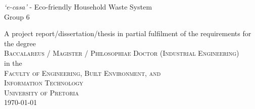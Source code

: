 \thispagestyle{empty}
\begin{center}
{\huge \textit{`e-casa'} - Eco-friendly Household Waste System}
\vspace{20mm} \\
{\Large Group 6}
\vfill

A project report/dissertation/thesis in partial fulfilment of the requirements for the degree \\
\vspace{10mm}
{\Large \textsc{Baccalareus / Magister / Philosophiae Doctor (Industrial Engineering)}} \\
\vfill
%
in the \\
\vspace{20mm}
%
{\Large \textsc{Faculty of Engineering, Built Environment, and \\ 
Information Technology}}\\
%
\vspace{10mm}
{\Large\textsc{University of Pretoria}} \\
%
\vfill
%
\today
\end{center}
